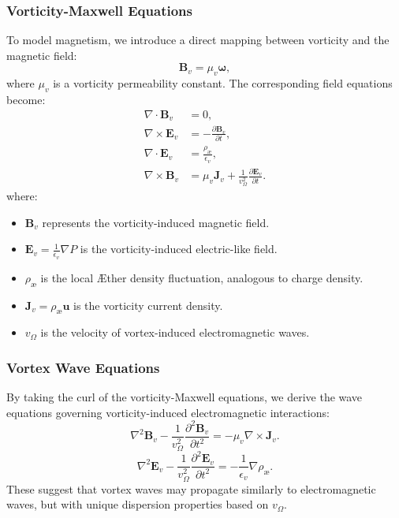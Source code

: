 \subsubsection*{Vorticity-Maxwell Equations}
To model magnetism, we introduce a direct mapping between vorticity and the magnetic field:
\begin{equation}
    \boldsymbol{B}_v = \mu_v \boldsymbol{\omega},
\end{equation}
where $\mu_v$ is a vorticity permeability constant. The corresponding field equations become:
\begin{align}
    \nabla \cdot \boldsymbol{B}_v &= 0, \\
    \nabla \times \boldsymbol{E}_v &= -\frac{\partial \boldsymbol{B}_v}{\partial t}, \\
    \nabla \cdot \boldsymbol{E}_v &= \frac{\rho_{\text{æ}}}{\epsilon_v}, \\
    \nabla \times \boldsymbol{B}_v &= \mu_v \boldsymbol{J}_v + \frac{1}{v_\Omega^2} \frac{\partial \boldsymbol{E}_v}{\partial t}.
\end{align}
where:
\begin{itemize}
    \item $\boldsymbol{B}_v$ represents the vorticity-induced magnetic field.
    \item $\boldsymbol{E}_v = \frac{1}{\epsilon_v} \nabla P$ is the vorticity-induced electric-like field.
    \item $\rho_{\text{æ}}$ is the local Æther density fluctuation, analogous to charge density.
    \item $\boldsymbol{J}_v = \rho_{\text{æ}} \boldsymbol{u}$ is the vorticity current density.
    \item $v_\Omega$ is the velocity of vortex-induced electromagnetic waves.
\end{itemize}

\subsubsection*{Vortex Wave Equations}
By taking the curl of the vorticity-Maxwell equations, we derive the wave equations governing vorticity-induced electromagnetic interactions:
\begin{equation}
    \nabla^2 \boldsymbol{B}_v - \frac{1}{v_\Omega^2} \frac{\partial^2 \boldsymbol{B}_v}{\partial t^2} = -\mu_v \nabla \times \boldsymbol{J}_v.
\end{equation}
\begin{equation}
    \nabla^2 \boldsymbol{E}_v - \frac{1}{v_\Omega^2} \frac{\partial^2 \boldsymbol{E}_v}{\partial t^2} = -\frac{1}{\epsilon_v} \nabla \rho_{\text{æ}}.
\end{equation}
These suggest that vortex waves may propagate similarly to electromagnetic waves, but with unique dispersion properties based on $v_\Omega$.

